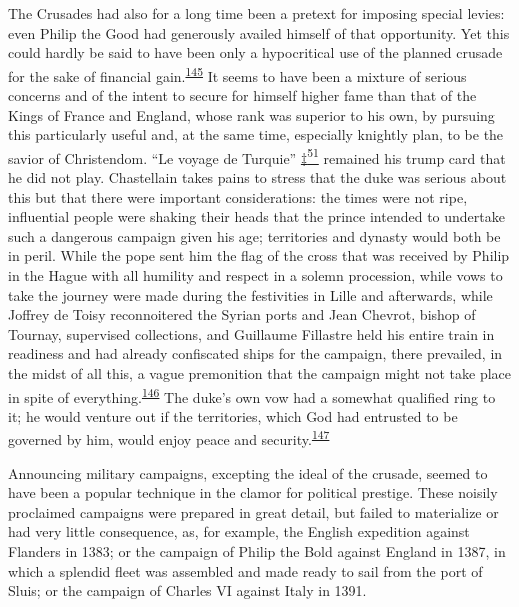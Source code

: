 The Crusades had also for a long time been a pretext for imposing
special levies: even Philip the Good had generously availed himself of
that opportunity. Yet this could hardly be said to have been only a
hypocritical use of the planned crusade for the sake of financial
gain.\textsuperscript{\protect\hypertarget{10_Chapter_Three__THE_HEROIC_DREAM.xhtmlux5cux23id_1645}{\protect\hyperlink{23_NOTES.xhtmlux5cux23id_1646}{145}}}
It seems to have been a mixture of serious concerns and of the intent to
secure for himself higher fame than that of the Kings of France and
England, whose rank was superior to his own, by pursuing this
particularly useful and, at the same time, especially knightly plan, to
be the savior of Christendom. ``Le voyage de Turquie''
\protect\hypertarget{10_Chapter_Three__THE_HEROIC_DREAM.xhtmlux5cux23id_2889}{\protect\hyperlink{23_NOTES.xhtmlux5cux23id_2890}{‡\textsuperscript{51}}}
remained his trump card that he did not play. Chastellain takes pains to
stress that the duke was serious about this but that there were
important considerations: the times were not ripe, influential people
were shaking their heads that the prince intended to undertake such a
dangerous campaign given his age; territories and dynasty would both be
in peril. While the pope sent him the flag of the cross that was
received by Philip in the Hague with all humility and respect in a
solemn procession, while vows to take
\protect\hypertarget{10_Chapter_Three__THE_HEROIC_DREAM.xhtmlux5cux23page_107}{}{}the
journey were made during the festivities in Lille and afterwards, while
Joffrey de Toisy reconnoitered the Syrian ports and Jean Chevrot, bishop
of Tournay, supervised collections, and Guillaume Fillastre held his
entire train in readiness and had already confiscated ships for the
campaign, there prevailed, in the midst of all this, a vague premonition
that the campaign might not take place in spite of
everything.\textsuperscript{\protect\hypertarget{10_Chapter_Three__THE_HEROIC_DREAM.xhtmlux5cux23id_1643}{\protect\hyperlink{23_NOTES.xhtmlux5cux23id_1644}{146}}}
The duke's own vow had a somewhat qualified ring to it; he would venture
out if the territories, which God had entrusted to be governed by him,
would enjoy peace and
security.\textsuperscript{\protect\hypertarget{10_Chapter_Three__THE_HEROIC_DREAM.xhtmlux5cux23id_1641}{\protect\hyperlink{23_NOTES.xhtmlux5cux23id_1642}{147}}}

Announcing military campaigns, excepting the ideal of the crusade,
seemed to have been a popular technique in the clamor for political
prestige. These noisily proclaimed campaigns were prepared in great
detail, but failed to materialize or had very little consequence, as,
for example, the English expedition against Flanders in 1383; or the
campaign of Philip the Bold against England in 1387, in which a splendid
fleet was assembled and made ready to sail from the port of Sluis; or
the campaign of Charles VI against Italy in 1391.

